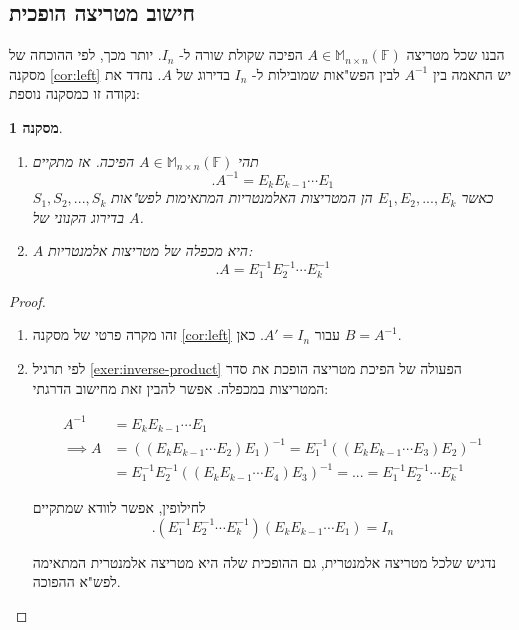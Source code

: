 \documentclass[12pt]{report}
\theoremstyle{plain}
\newtheorem{corollary}[theorem]{מסקנה}
\theoremstyle{definition}
\newcommand{\F}{\mathbb{F}}
\newcommand{\M}{\mathbb{M}}
\newcommand{\0}{\mathbf{0}}
\begin{document}
\subsection{חישוב מטריצה הופכית}

הבנו שכל מטריצה
$A\in\M_{n\times n}(\F)$
הפיכה שקולת שורה ל-
$I_n$.
יותר מכך, לפי ההוכחה של מסקנה
\ref{cor:left}
יש התאמה בין 
$A^{-1}$
לבין הפש"אות שמובילות ל-
$I_n$
בדירוג של 
$A$.
נחדד את נקודה זו כמסקנה נוספת:

\begin{corollary}\label{cor:elementary-product}\
\begin{enumerate}[label=\alph*.]
\item
תהי 
$A\in\M_{n\times n}(\F)$
הפיכה. אז מתקיים
$$
.A^{-1}=E_kE_{k-1}\cdots E_1
$$
כאשר
$E_1,E_2,...,E_k$
הן המטריצות האלמנטריות המתאימות לפש"אות
$S_1,S_2,...,S_k$
בדירוג הקנוני של 
$A$.


\item 
$A$
היא מכפלה של מטריצות אלמנטריות:
$$
.A=E_1^{-1}E_2^{-1}\cdots E_k^{-1}
$$


\end{enumerate}
\end{corollary}

\begin{proof}\
\begin{enumerate}[label=\alph*.]
\item
זהו מקרה פרטי של מסקנה
\ref{cor:left}
עבור
$A'=I_n$.
כאן
$B=A^{-1}$.


\item 
לפי תרגיל
\ref{exer:inverse-product}
הפעולה של הפיכת מטריצה הופכת את סדר המטריצות במכפלה. אפשר להבין זאת מחישוב הדרגתי:

$$
\begin{aligned}
A^{-1}&=E_kE_{k-1}\cdots E_1 \\
\implies A&=((E_kE_{k-1}\cdots E_2) E_1)^{-1}=E_1^{-1}((E_kE_{k-1}\cdots E_3)E_2)^{-1}\\
&=E_1^{-1}E_2^{-1}((E_kE_{k-1}\cdots E_4)E_3)^{-1}=...=E_1^{-1}E_2^{-1}\cdots E_k^{-1}
\end{aligned}
$$

לחילופין, אפשר לוודא שמתקיים
$$
.(E_1^{-1}E_2^{-1}\cdots E_k^{-1})(E_kE_{k-1}\cdots E_1)=I_n
$$

נדגיש שלכל מטריצה אלמנטרית, גם ההופכית שלה היא מטריצה אלמנטרית המתאימה לפש"א ההפוכה.

\end{enumerate}
\end{proof}
\end{document}
